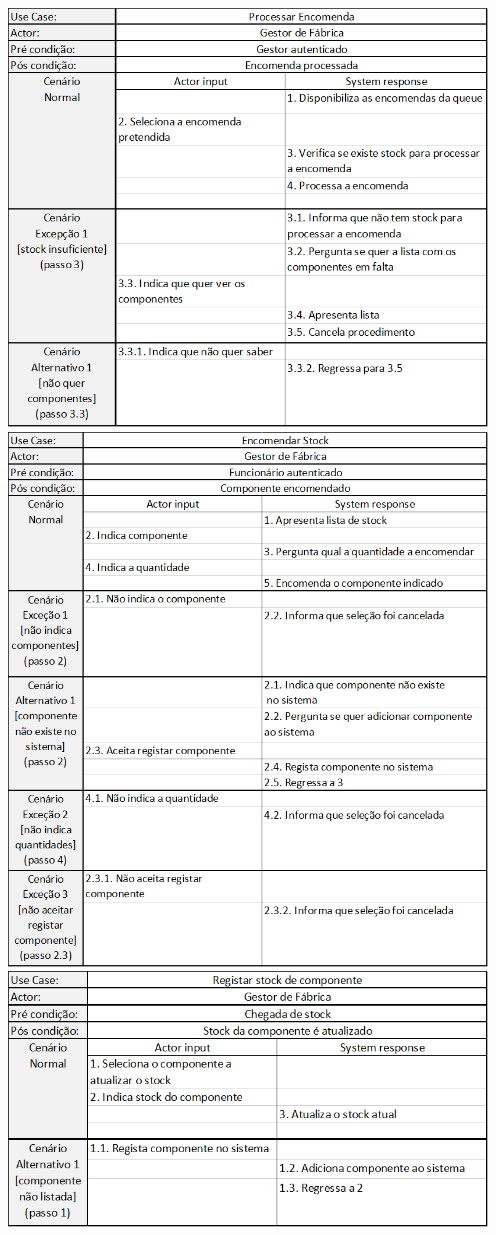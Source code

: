 \documentclass[11pt]{article} %
\begin{document}
\begin{enumerate}
\begin{center}
	\end{center}
	\begin{center}
 		\includegraphics[width = 5in]{gf_processarencomenda.png} 
		\includegraphics[width = 5in]{gf_encomendarstock.png} 
		\includegraphics[width = 5in]{gf_registarstock.png}

\end{center}
\end{enumerate}
\end{document}
